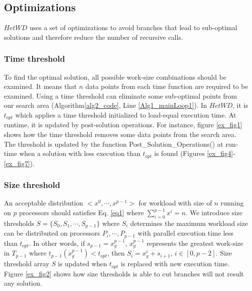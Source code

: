\documentclass[12pt]{article}
\begin{document}
\subsection{Optimizations} \label{sec_opt}
$HetWD$ uses a set of optimizations to avoid branches that lead to sub-optimal solutions and therefore reduce the number of recursive calls.

\subsubsection{Time threshold} \label{sec_time_threshold}
To find the optimal solution, all possible work-size combinations should be examined. It means that $n$ data points from each time function are required to be examined. Using a time threshold can eliminate some sub-optimal points from our search area (Algorithm\ref{alg2_code}, Line \ref{Alg1_mainLoop1}). In $HetWD$, it is $t_{opt}$ which applies a time threshold initialized to load-equal execution time. At runtime, it is updated by post-solution operations.
For instance, figure \ref{ex_fig1} shows how the time threshold removes some data points from the search area. The threshold is updated by the function Post\_Solution\_Operations() at run-time when a solution with less execution than $t_{opt}$ is found (Figures \ref{ex_fig4}-\ref{ex_fig7}).

\subsubsection{Size threshold} \label{sec_size_Threshold}
An acceptable distribution $<x^0,\cdots,x^{p-1}>$ for workload with size of $n$ running on $p$ processors should satisfies Eq. \ref{eq1} where $\sum_{i=0}^{p-1}x^i=n$. We introduce size thresholds $S=\{S_0,S_1,\cdots,S_{p-1}\}$ where $S_i$ determines the maximum workload size can be distributed on processors $P_i,\cdots,P_{p-1}$ with parallel execution time less than $t_{opt}$. In other words, if $s_{p-1}=x_g^{p-1}$, $x_g^{p-1}$ represents the greatest work-size in $T_{p-1}$ where $t_{p-1}(x_g^{p-1})<t_{opt}$, then $S_i=x_g^i+s_{i+1}$, $i \in [0,p-2]$. Size threshold array $S$ is updated when $t_{opt}$ is replaced with new execution time. Figure \ref{ex_fig2} shows how size thresholds is able to cut branches will not result any solution. 
\end{document}
